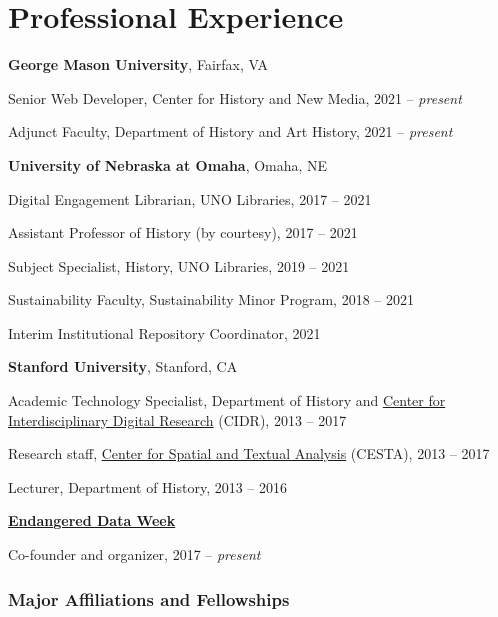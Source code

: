 \section{Professional Experience}\label{professional-experience}

\textbf{George Mason University}, Fairfax, VA

\quad Senior Web Developer, Center for History and New Media, 2021 --
\emph{present}

\quad Adjunct Faculty, Department of History and Art History, 2021 --
\emph{present}

\vspace{.4cm}

\textbf{University of Nebraska at Omaha}, Omaha, NE

\quad Digital Engagement Librarian, UNO Libraries, 2017 -- 2021

\quad Assistant Professor of History (by courtesy), 2017 -- 2021

\quad Subject Specialist, History, UNO Libraries, 2019 -- 2021

\quad Sustainability Faculty, Sustainability Minor Program, 2018 -- 2021

\quad Interim Institutional Repository Coordinator, 2021

\vspace{.4cm}

\textbf{Stanford University}, Stanford, CA

\quad Academic Technology Specialist, Department of History and
\href{http://cidr.stanford.edu}{Center for Interdisciplinary Digital
Research} (CIDR), 2013 -- 2017

\quad Research staff, \href{http://cesta.stanford.edu}{Center for
Spatial and Textual Analysis} (CESTA), 2013 -- 2017

\quad Lecturer, Department of History, 2013 -- 2016

\vspace{.4cm}

\textbf{\href{https://endangereddataweek.org}{Endangered Data Week}}

\quad Co-founder and organizer, 2017 -- \emph{present}

\vspace{0.2cm}

\newpage

\subsubsection{Major Affiliations and
Fellowships}\label{major-affiliations-and-fellowships}

